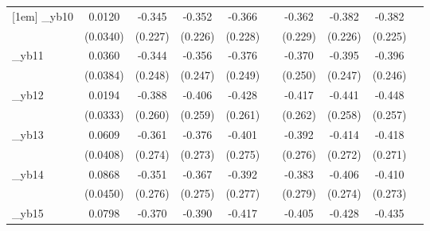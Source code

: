\begin{table}[htbp]
\begin{tabular}{l*{9}{c}}
[1em]
\_yb10       &      0.0120         &      -0.345         &      -0.352         &      -0.366         &                     &      -0.362         &      -0.382\sym{*}  &      -0.382\sym{*}  &                     \\
            &    (0.0340)         &     (0.227)         &     (0.226)         &     (0.228)         &                     &     (0.229)         &     (0.226)         &     (0.225)         &                     \\
[1em]
\_yb11       &      0.0360         &      -0.344         &      -0.356         &      -0.376         &                     &      -0.370         &      -0.395         &      -0.396         &                     \\
            &    (0.0384)         &     (0.248)         &     (0.247)         &     (0.249)         &                     &     (0.250)         &     (0.247)         &     (0.246)         &                     \\
[1em]
\_yb12       &      0.0194         &      -0.388         &      -0.406         &      -0.428         &                     &      -0.417         &      -0.441\sym{*}  &      -0.448\sym{*}  &                     \\
            &    (0.0333)         &     (0.260)         &     (0.259)         &     (0.261)         &                     &     (0.262)         &     (0.258)         &     (0.257)         &                     \\
[1em]
\_yb13       &      0.0609         &      -0.361         &      -0.376         &      -0.401         &                     &      -0.392         &      -0.414         &      -0.418         &                     \\
            &    (0.0408)         &     (0.274)         &     (0.273)         &     (0.275)         &                     &     (0.276)         &     (0.272)         &     (0.271)         &                     \\
[1em]
\_yb14       &      0.0868\sym{*}  &      -0.351         &      -0.367         &      -0.392         &                     &      -0.383         &      -0.406         &      -0.410         &                     \\
            &    (0.0450)         &     (0.276)         &     (0.275)         &     (0.277)         &                     &     (0.279)         &     (0.274)         &     (0.273)         &                     \\
[1em]
\_yb15       &      0.0798\sym{*}  &      -0.370         &      -0.390         &      -0.417         &                     &      -0.405         &      -0.428         &      -0.435         &                     \\

\end{tabular}
\end{table}
